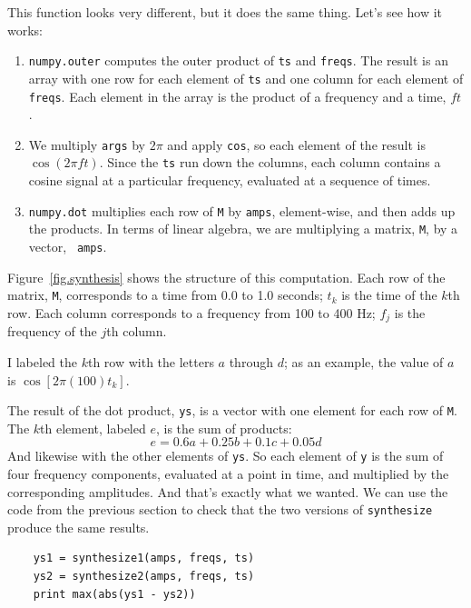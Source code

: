 \documentclass[12pt]{book}
\begin{document}
This function looks very different, but it does the same thing.
Let's see how it works:

\begin{enumerate}

\item {\tt numpy.outer} computes the outer product of {\tt ts} and
  {\tt freqs}.  The result is an array with one row for each element
  of {\tt ts} and one column for each element of {\tt freqs}.  Each
  element in the array is the product of a frequency and a time, $f
  t$.

\item We multiply {\tt args} by $2 \pi$ and apply {\tt cos}, so each
  element of the result is $\cos (2 \pi f t)$.  Since the {\tt ts} run
  down the columns, each column contains a cosine signal at a
  particular frequency, evaluated at a sequence of times.

\item {\tt numpy.dot} multiplies each row of {\tt M} by {\tt amps},
  element-wise, and then adds up the products.  In terms of linear
  algebra, we are multiplying a matrix, {\tt M}, by a vector, {\tt
    amps}.

\end{enumerate}

Figure~\ref{fig.synthesis} shows the structure of this computation.
Each row of the matrix, {\tt M}, corresponds to a time 
from 0.0 to 1.0 seconds; $t_k$ is the time of the $k$th row.
Each column corresponds to a frequency from
100 to 400 Hz; $f_j$ is the frequency of the $j$th column.

I labeled the $k$th row with the letters $a$ through $d$; as an
example, the value of $a$ is $\cos [2 \pi (100) t_k]$.

The result of the dot product, {\tt ys}, is a vector with one element
for each row of {\tt M}.  The $k$th element, labeled $e$, is the sum
of products:
%
\[ e = 0.6 a + 0.25 b + 0.1 c + 0.05 d \]
%
And likewise with the other elements of {\tt ys}.  So each element
of {\tt y} is the sum of four frequency components, evaluated at
a point in time, and multiplied by the corresponding amplitudes.
And that's exactly what we wanted.  We can use the code from
the previous section to
check that the two versions of {\tt synthesize} produce the same results.

\begin{verbatim}
    ys1 = synthesize1(amps, freqs, ts)
    ys2 = synthesize2(amps, freqs, ts)
    print max(abs(ys1 - ys2))
\end{verbatim}
\end{document}
